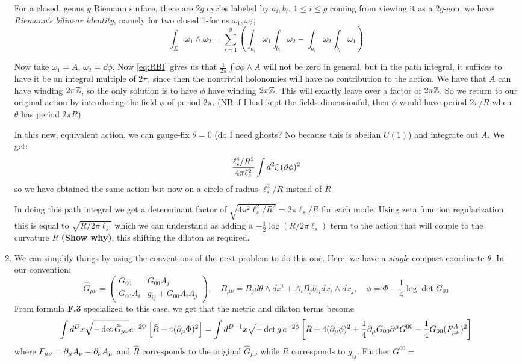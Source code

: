 \documentclass[11pt, class=article, crop=false]{standalone}
\begin{document}
\begin{enumerate}
	For a closed, genus $g$ Riemann surface, there are $2g$ cycles labeled by $a_i, b_i, \, 1\leq i \leq g$ coming from viewing it as a $2g$-gon. we have \emph{Riemann's bilinear identity}, namely for two closed 1-forms $\omega_1, \omega_2$, 
	\begin{equation}\label{eq:RBI}
			\int_\Sigma \omega_1 \wedge \omega_2 = \sum_{i=1}^g \left(\int_{a_i} \omega_1 \int_{b_i} \omega_2 - \int_{a_i} \omega_2 \int_{b_i} \omega_1 \right)	
	\end{equation}

	Now take $\omega_1 = A$, $\omega_2 = \dd \phi$. Now \eqref{eq:RBI} gives us that $\frac{1}{2\pi} \int \dd \phi \wedge A$ will not be zero in general, but in the path integral, it suffices to have it be an integral multiple of $2 \pi$, since then the nontrivial holonomies will have no contribution to the action. We have that $A$ can have winding $2 \pi \mathbb{Z}$, so the only solution is to have $\phi$ have winding $2 \pi \mathbb{Z}$. This will exactly leave over a factor of $2 \pi \mathbb{Z}$. So we return to our original action by introducing the field $\phi$ of period $2\pi$. (NB if I had kept the fields dimensionful, then $\phi$ would have period $2 \pi /R$ when $\theta$ has period $2 \pi R$)
	
	In this new, equivalent action, we can gauge-fix $\theta=0$ (do I need ghosts? No because this is abelian $U(1)$) and integrate out $A$. We get:
	\[
		\frac{\ell_s^4 / R^2}{4\pi \ell_s^2} \int d^2 \xi \, (\partial \phi)^2 
	\]
	so we have obtained the same action but now on a circle of radius $\ell_s^2/R$ instead of $R$. 
	
	In doing this path integral we get a determinant factor of $\sqrt{4 \pi^2 \ell_s^2/R^2} = 2 \pi \ell_s/R$ for each mode. Using zeta function regularization this is equal to $\sqrt{R/2 \pi \ell_s}$ which we can understand as adding a $-\frac12 \log(R/2 \pi \ell_s)$ term to the action that will couple to the curvature $R$ \textbf{(Show why)}, this shifting the dilaton as required.
	
	\item We can simplify things by using the conventions of the next problem to do this one. Here, we have a \emph{single} compact coordinate $\theta$. In our convention:
	\[
		\hat G_{\mu \nu} = \begin{pmatrix}
			G_{00} & G_{00} A_j\\
			G_{00} A_i & g_{ij} + G_{00} A_i A_j
		\end{pmatrix}, \quad B_{\mu \nu} = B_j d\theta \wedge dx^i + A_i B_j b_{ij} dx_i \wedge dx_j, \quad \phi = \Phi - \frac14 \log \det G_{00}
	\]
	 From formula \textbf{F.3} specialized to this case, we get that the metric and dilaton terms become
	\begin{equation}\label{eq:gdil}
		\int d^D x \sqrt{-\det \hat G_{\mu \nu}} e^{-2 \Phi} \left[\hat R + 4 (\partial_\mu \Phi)^2 \right] = \int d^{D-1}x \sqrt{-\det g}\, e^{-2 \phi} \left[R + 4 (\partial_\mu \phi)^2 + \frac14 \partial_\mu G_{00} \partial^\mu G^{00} - \frac14 G_{00} (F^A_{\mu \nu})^2\right]
	\end{equation}
	where $F_{\mu \nu} = \partial_\mu A_\nu - \partial_\nu A_\mu$ and $\hat R$ corresponds to the original $\hat G_{\mu \nu}$ while $R$ corresponds to $g_{ij}$. Further $G^{00} = $
	

\end{enumerate}
\end{document}
